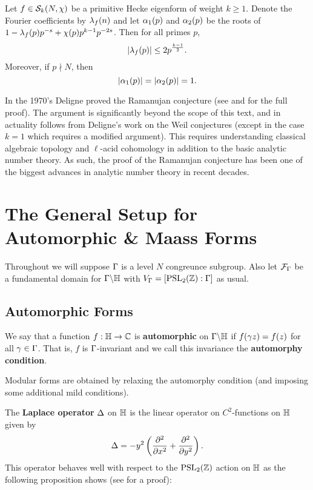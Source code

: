       \begin{theorem}
        Let $f \in \mathcal{S}_{k}(N,\chi)$ be a primitive Hecke eigenform of weight $k \ge 1$. Denote the Fourier coefficients by $\lambda_{f}(n)$ and let $\alpha_{1}(p)$ and $\alpha_{2}(p)$ be the roots of $1-\lambda_{f}(p)p^{-s}+\chi(p)p^{k-1}p^{-2s}$. Then for all primes $p$,
        \[
          |\lambda_{f}(p)| \le 2p^{\frac{k-1}{2}}.
        \]
        Moreover, if $p \nmid N$, then
        \[
          |\alpha_{1}(p)| = |\alpha_{2}(p)| = 1.
        \]
      \end{theorem}

      In the 1970's Deligne proved the Ramanujan conjecture (see \cite{deligne1971formes} and \cite{deligne1974conjecture} for the full proof). The argument is significantly beyond the scope of this text, and in actuality follows from Deligne's work on the Weil conjectures (except in the case $k = 1$ which requires a modified argument). This requires understanding classical algebraic topology and $\ell$-acid cohomology in addition to the basic analytic number theory. As such, the proof of the Ramanujan conjecture has been one of the biggest advances in analytic number theory in recent decades.
  \section{The General Setup for Automorphic \& Maass Forms}
    Throughout we will suppose $\Gamma$ is a level $N$ congreunce subgroup. Also let $\mathcal{F}_{\Gamma}$ be a fundamental domain for $\Gamma\backslash\mathbb{H}$ with $V_{\Gamma} = [\mathrm{PSL}_{2}(\mathbb{Z}):\Gamma]$ as usual.
    \subsection*{Automorphic Forms}
      We say that a function $f:\mathbb{H} \to \mathbb{C}$ is \textbf{automorphic} on $\Gamma\backslash\mathbb{H}$ if $f(\gamma z) = f(z)$ for all $\gamma \in \Gamma$. That is, $f$ is $\Gamma$-invariant and we call this invariance the \textbf{automorphy condition}.

      \begin{remark}
        Modular forms are obtained by relaxing the automorphy condition (and imposing some additional mild conditions).
      \end{remark}
      
      The \textbf{Laplace operator} $\Delta$ on $\mathbb{H}$ is the linear operator on $C^{2}$-functions on $\mathbb{H}$ given by
      \[
        \Delta = -y^{2}\left(\frac{\partial^{2}}{\partial x^{2}}+\frac{\partial^{2}}{\partial y^{2}}\right).
      \]
      This operator behaves well with respect to the $\mathrm{PSL}_{2}(\mathbb{Z})$ action on $\mathbb{H}$ as the following proposition shows (see \cite{motohashi1997spectral} for a proof):


